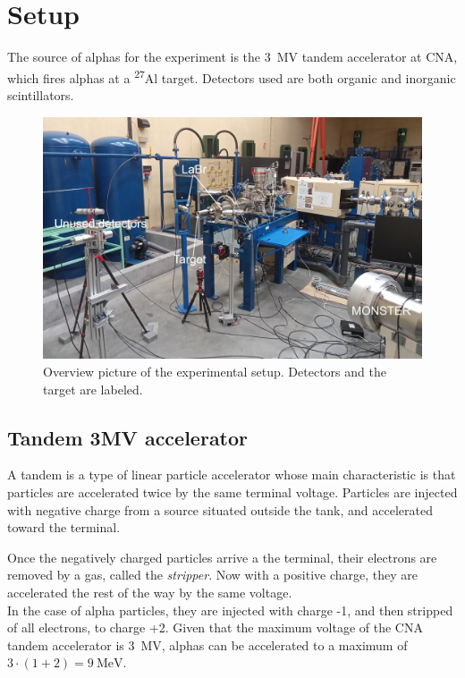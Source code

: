 \documentclass[a4paper,12pt]{report}
\newcommand{\Aliso}{\textsuperscript{27}Al }
\begin{document}
\section{Setup}
The source of alphas for the experiment is the \qty{3}{\mega\volt} tandem accelerator at CNA, which fires alphas at a \Aliso target.
Detectors used are both organic and inorganic scintillators.

\begin{figure}[H]
	\centering
	\includegraphics[width=\textwidth]{overview_photo.jpg}
	\caption{Overview picture of the experimental setup.
	Detectors and the target are labeled.}
	\label{overview_photo}
\end{figure}

\subsection{Tandem 3MV accelerator}
A tandem is a type of linear particle accelerator whose main characteristic is that particles are accelerated twice by the same terminal voltage.
Particles are injected with negative charge from a source situated outside the tank, and accelerated toward the terminal.

Once the negatively charged particles arrive a the terminal, their electrons are removed by a gas, called the \textit{stripper}.
Now with a positive charge, they are accelerated the rest of the way by the same voltage.
\\

In the case of alpha particles, they are injected with charge -1, and then stripped of all electrons, to charge +2.
Given that the maximum voltage of the CNA tandem accelerator is \qty{3}{\mega\volt}, alphas can be accelerated to a maximum of $3\cdot\left(1+2\right) = \qty{9}{\mega\eV}$.	%
\\
\end{document}
